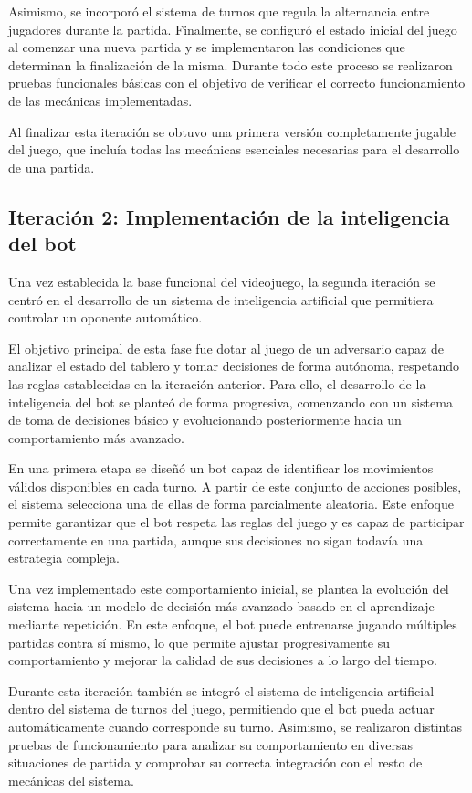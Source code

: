 Asimismo, se incorporó el sistema de turnos que regula la alternancia entre jugadores durante la partida. Finalmente, se configuró el estado inicial del juego al comenzar una nueva partida y se implementaron las condiciones que determinan la finalización de la misma. Durante todo este proceso se realizaron pruebas funcionales básicas con el objetivo de verificar el correcto funcionamiento de las mecánicas implementadas.

Al finalizar esta iteración se obtuvo una primera versión completamente jugable del juego, que incluía todas las mecánicas esenciales necesarias para el desarrollo de una partida.

\subsection{Iteración 2: Implementación de la inteligencia del bot}

Una vez establecida la base funcional del videojuego, la segunda iteración se centró en el desarrollo de un sistema de inteligencia artificial que permitiera controlar un oponente automático.

El objetivo principal de esta fase fue dotar al juego de un adversario capaz de analizar el estado del tablero y tomar decisiones de forma autónoma, respetando las reglas establecidas en la iteración anterior. Para ello, el desarrollo de la inteligencia del bot se planteó de forma progresiva, comenzando con un sistema de toma de decisiones básico y evolucionando posteriormente hacia un comportamiento más avanzado.

En una primera etapa se diseñó un bot capaz de identificar los movimientos válidos disponibles en cada turno. A partir de este conjunto de acciones posibles, el sistema selecciona una de ellas de forma parcialmente aleatoria. Este enfoque permite garantizar que el bot respeta las reglas del juego y es capaz de participar correctamente en una partida, aunque sus decisiones no sigan todavía una estrategia compleja.

Una vez implementado este comportamiento inicial, se plantea la evolución del sistema hacia un modelo de decisión más avanzado basado en el aprendizaje mediante repetición. En este enfoque, el bot puede entrenarse jugando múltiples partidas contra sí mismo, lo que permite ajustar progresivamente su comportamiento y mejorar la calidad de sus decisiones a lo largo del tiempo.

Durante esta iteración también se integró el sistema de inteligencia artificial dentro del sistema de turnos del juego, permitiendo que el bot pueda actuar automáticamente cuando corresponde su turno. Asimismo, se realizaron distintas pruebas de funcionamiento para analizar su comportamiento en diversas situaciones de partida y comprobar su correcta integración con el resto de mecánicas del sistema.

